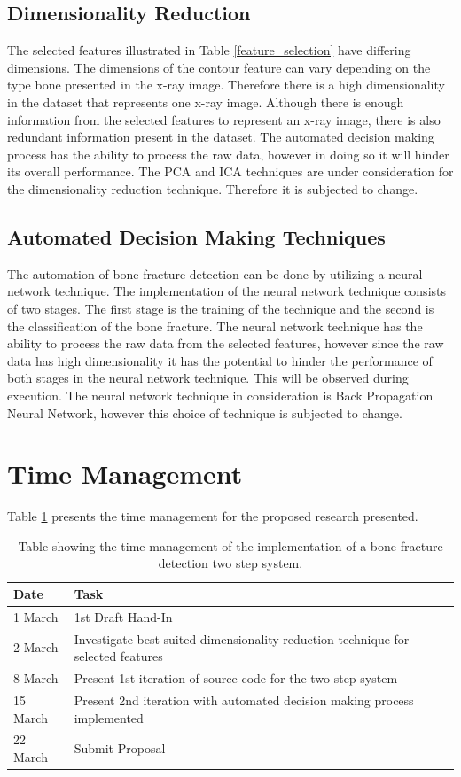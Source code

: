 \documentclass[11pt,twocolumn]{witseiepaper}
\begin{document}
	\subsection{Dimensionality Reduction}
	The selected features illustrated in Table \ref{feature_selection} have differing dimensions. The dimensions of the contour feature can vary depending on the type bone presented in the x-ray image. Therefore there is a high dimensionality in the dataset that represents one x-ray image. Although there is enough information from the selected features to represent an x-ray image, there is also redundant information present in the dataset. The automated decision making process has the ability to process the raw data, however in doing so it will hinder its overall performance. The PCA and ICA techniques are under consideration for the dimensionality reduction technique. Therefore it is subjected to change. 
	
	\subsection{Automated Decision Making Techniques}
	The automation of bone fracture detection can be done by utilizing a neural network technique. The implementation of the neural network technique consists of two stages. The first stage is the training of the technique and the second is the classification of the bone fracture. The neural network technique has the ability to process the raw data from the selected features, however since the raw data has high dimensionality it has the potential to hinder the performance of both stages in the neural network technique. This will be observed during execution. The neural network technique in consideration is Back Propagation Neural Network, however this choice of technique is subjected to change.

	\section{Time Management}
	Table \ref{time_management} presents the time management for the proposed research presented. 
	\begin{table}[!h]
		\centering
		\caption{Table showing the time management of the implementation of a bone fracture detection two step system.}
		\label{time_management}
		\begin{tabular}{|l|p{5cm}|}
		\hline
		Date & Task \\
		\hline \hline
		1 March & 1st Draft Hand-In \\
		\hline
		2 March & Investigate best suited dimensionality reduction technique for selected features \\
		\hline
		8 March & Present 1st iteration of source code for the two step system \\
		\hline
		15 March & Present 2nd iteration with automated decision making process implemented \\
		\hline
		22 March & Submit Proposal \\
		\hline
		\end{tabular}
	\end{table}
	
\end{document}
